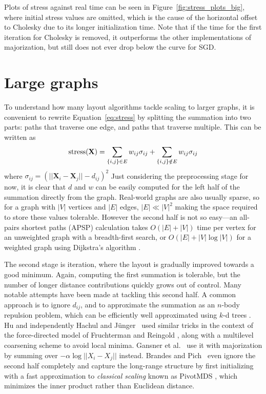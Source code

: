 Plots of stress against real time can be seen in Figure~\ref{fig:stress_plots_big}, where initial stress values are omitted, which is the cause of the horizontal offset to Cholesky due to its longer initialization time.
Note that if the time for the first iteration for Cholesky is removed, it outperforms the other implementations of majorization, but still does not ever drop below the curve for SGD.


\section{Large graphs}
\label{sec:large_graphs}
To understand how many layout algorithms tackle scaling to larger graphs, it is convenient to rewrite Equation~\eqref{eq:stress} by splitting the summation into two parts: paths that traverse one edge, and paths that traverse multiple.
This can be written as
\begin{equation}
  \text{stress}(\mathbf{X}) = \sum_{\{i,j\}\in E}w_{ij}\sigma_{ij}\\
  + \sum_{\{i,j\}\notin E}w_{ij}\sigma_{ij}
  \label{split stress}
\end{equation}
where $\sigma_{ij} = (||\mathbf{X}_i - \mathbf{X}_j|| - d_{ij})^2$
Just considering the preprocessing stage for now, it is clear that $d$ and $w$ can be easily computed for the left half of the summation directly from the graph. Real-world graphs are also usually sparse, so for a graph with $|V|$ vertices and $|E|$ edges, $|E| \ll |V|^2$ making the space required to store these values tolerable. However the second half is not so easy---an all-pairs shortest paths (APSP) calculation takes $O(|E| + |V|)$ time per vertex for an unweighted graph with a breadth-first search, or $O(|E| + |V|\log|V|)$ for a weighted graph using Dijkstra's algorithm \cite{Cormen2009}.

The second stage is iteration, where the layout is gradually improved towards a good minimum. Again, computing the first summation is tolerable, but the number of longer distance contributions quickly grows out of control. Many notable attempts have been made at tackling this second half. A common approach is to ignore $d_{ij}$, and to approximate the summation as an $n$-body repulsion problem, which can be efficiently well approximated using $k$-d trees \cite{Barnes1986}. Hu \cite{Hu2005} and independently Hachul and J\"unger~\cite{Hachul2004} used similar tricks in the context of the force-directed model of Fruchterman and Reingold \cite{Fruchterman1991}, along with a multilevel coarsening scheme to avoid local minima. Gansner et al.\ \cite{Gansner2013} use it with majorization by summing over $-\alpha \log||X_i - X_j||$ instead. Brandes and Pich~\cite{Brandes2007Eigensolver} even ignore the second half completely and capture the long-range structure by first initializing with a fast approximation to \emph{classical scaling} known as PivotMDS \cite{Brandes2008}, which minimizes the inner product rather than Euclidean distance.


